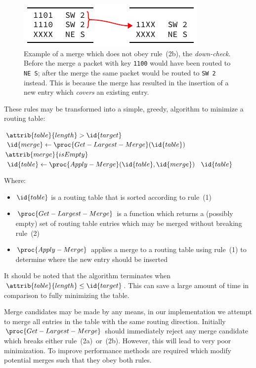 \documentclass[conference]{IEEEtran}
\newcommand{\mytt}[1]{\texttt{\footnotesize#1}}
\begin{document}
  \begin{figure}
    \centering
    \includegraphics{figures/rule2b_example}
    \caption{
      Example of a merge which does not obey rule~(2b), the \textit{down-check}.
      Before the merge a packet with key \mytt{1100} would have been routed to \mytt{NE~S}; after the merge the same packet would be routed to \mytt{SW 2} instead.
      This is because the merge has resulted in the insertion of a new entry which \textit{covers} an existing entry.
    }
    \label{fig:algorithm/rule2b_example}
  \end{figure}

  These rules may be transformed into a simple, greedy, algorithm to minimize a routing table:

  \begin{codebox}
    \li \While $\attrib{table}{length} >  \id{target}$
    \li \Do $\id{merge} \gets \proc{Get-Largest-Merge}(\id{table})$
    \li     \If $\attrib{merge}{isEmpty}$
    \li     \Then {} \End
    \li     $\id{table} \gets \proc{Apply-Merge}(\id{table}, \id{merge})$
        \End
    \li \Return $\id{table}$
  \end{codebox}

  \noindent Where:
  \begin{itemize}
    \item $\id{table}$ is a routing table that is sorted according to rule~(1)
    \item $\proc{Get-Largest-Merge}$ is a function which returns a (possibly empty) set of routing table entries which may be merged without breaking rule~(2)
    \item $\proc{Apply-Merge}$ applies a merge to a routing table using rule~(1) to determine where the new entry should be inserted
  \end{itemize}

  It should be noted that the algorithm terminates when $\attrib{table}{length} \le \id{target}$.
  This can save a large amount of time in comparison to fully minimizing the table.

  Merge candidates may be made by any means, in our implementation we attempt to merge all entries in the table with the same routing direction.
  Initially $\proc{Get-Largest-Merge}$ should immediately reject any merge candidate which breaks either rule~(2a)~or~(2b).
  However, this will lead to very poor minimization.
  To improve performance methods are required which modify potential merges such that they obey both rules.
\end{document}
